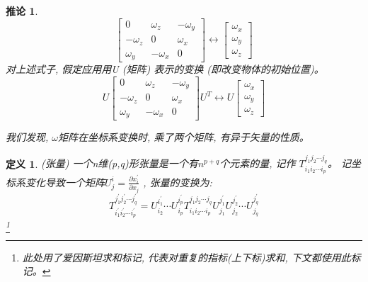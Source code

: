 \documentclass{ctexart}
\numberwithin{equation}{subsection}
\numberwithin{theorem}{subsection}
\newtheorem{definition} {定义}
\numberwithin{definition}{subsection}
\numberwithin{proof}{subsection}
\numberwithin{lemma}{subsection}
\numberwithin{example}{subsection}
\numberwithin{remark}{subsection}
\newtheorem{corollary}  {推论}
\numberwithin{corollary}{subsection}
\numberwithin{exercise}{subsection}
\numberwithin{problem}{subsection}
\numberwithin{question}{section}
\numberwithin{method}{subsection}
\begin{document}
    \begin{corollary}
        \label{1.3 eq:angular velocity rotation}
        \begin{equation}
            \begin{bmatrix}
                0 & \omega_z & -\omega_y \\
                -\omega_z & 0 & \omega_x \\
                \omega_y & -\omega_x & 0
            \end{bmatrix} \leftrightarrow \begin{bmatrix}
                \omega_x \\ \omega_y \\ \omega_z
            \end{bmatrix}
        \end{equation}
        对上述式子, 假定应用用U (矩阵) 表示的变换 (即改变物体的初始位置)。
        \begin{equation}
            U \begin{bmatrix}
                0 & \omega_z & -\omega_y \\
                -\omega_z & 0 & \omega_x \\
                \omega_y & -\omega_x & 0
            \end{bmatrix} U^T \leftrightarrow U \begin{bmatrix}
                \omega_x \\ \omega_y \\ \omega_z
            \end{bmatrix}
        \end{equation}

        我们发现, \(\omega\)矩阵在坐标系变换时, 乘了两个矩阵, 
        有异于矢量的性质。
    \end{corollary}

    \begin{definition}
        \label{1.3 def:3D tensor}
        (张量) 一个n维(p,q)形张量是一个有\(n^{p+q}\)个元素的量, 记作
        \(T_{i_1i_2\cdots i_p}^{j_1j_2\cdots j_q}\)。
        记坐标系变化导致一个矩阵\(U^i_j = \frac{\partial x_i ^ \prime}{\partial x_j}\)
        , 张量的变换为:
        \begin{equation}
            T_{i^\prime_1i^\prime_2\cdots i^\prime_p}^{j^\prime_1j^\prime_2\cdots j^\prime_q} = 
            U^{i^\prime_1}_{i_2} \cdots U^{i^\prime_p}_{i_p} T_{i_1i_2\cdots i_p}^{j_1j_2\cdots j_q} U^{j^\prime_1}_{j_1} U^{j^\prime_2}_{j_2} \cdots U^{j^\prime_q}_{j_q}
        \end{equation}
        \footnote{此处用了爱因斯坦求和标记, 代表对重复的指标(上下标)求和, 下文都使用此标记。}
    \end{definition}
\end{document}
